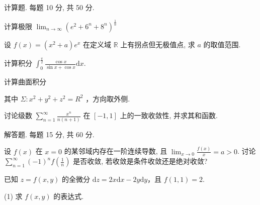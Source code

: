 \par{}
计算题. 每题 10 分, 共 50 分.\par
计算极限 $\lim_{n\to \infty}(e^2 +6^n +8^n)^{\frac{1}{n}}$\par
设 $f(x) = (x^2 + a)e^x$ 在定义域 $\mathbb{R}$ 上有拐点但无极值点, 求 $a$ 的取值范围.\par
计算积分 $\int_0^{\frac{\pi}{2}}\frac{\cos x}{\sin x + \cos x}\mathrm{d}x.$\par
\par{}
计算曲面积分\par
\nopagebreak[4]
其中  $\Sigma: x^{2} + y^{2} + z^{2} = R^{2}$ ，方向取外侧.\par
讨论级数 $\sum_{n=1}^{\infty} \frac{x^n}{n(n+1)}$ 在 $[-1, 1]$ 上的一致收敛性, 并求其和函数.\par
\par{}
解答题. 每题 15 分, 共 60 分.\par
设 $f(x)$ 在 $x = 0$ 的某邻域内存在一阶连续导数, 且 $\lim_{x \to 0} \frac{f(x)}{x} = a > 0$. 讨论 $\sum_{n=1}^{\infty} (-1)^n f\left(\frac{1}{n}\right)$ 是否收敛, 若收敛是条件收敛还是绝对收敛?\par
已知 $z = f(x, y)$ 的全微分 $\mathrm{d}z = 2x\mathrm{d}x - 2y\mathrm{d}y$，且 $f(1, 1) = 2$.\par
(1) 求 $f(x, y)$ 的表达式.\par
